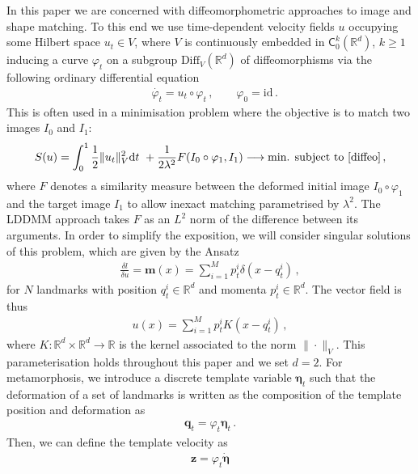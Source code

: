 \documentclass[runningheads]{llncs}
\newcommand{\half}{\frac 12}
\newcommand{\norm}[2]{\| #1 \|_{ #2 }}
\newcommand{\vnorm}[1]{\norm{ #1 }{V}}
\newcommand{\diff}[1]{\text{d} #1}
\newcommand{\Rd}{\mathbb{R}^{d}}
\begin{document}
In this paper we are concerned with diffeomorphometric approaches to image and
shape matching. To this end we use time-dependent velocity fields $u$ occupying
some Hilbert space $u_t \in V$, where $V$ is continuously embedded in
$\textsf{C}_0^k(\Rd)$, $k\geq 1$ inducing a curve $\varphi_t$ on a subgroup
$\text{Diff}_V(\Rd)$ of diffeomorphisms
\cite{arnold1966geometrie,younes2010shapes} via the following ordinary
differential equation
\begin{align}
& \dot{\varphi_t} = u_t \circ \varphi_t\, , \qquad  \varphi_0 = \text{id}\, . 
  \label{diffeo}
\end{align}
This is often used in a minimisation problem where the objective is to match two
images $I_0$ and $I_1$:
\begin{align}
  S(u) = \int_0^1 \half\vnorm{u_t}^2 \diff{t} + \frac{1}{2\lambda^2}
  F(I_0\circ\varphi_1, I_1)\longrightarrow \text{min. subject to \eqref{diffeo}}\, , \label{E-def}
\end{align}
where $F$ denotes a similarity measure between the deformed initial image
$I_0\circ \varphi_1$ and the target image $I_1$ to allow inexact matching
parametrised by $\lambda^2$. The LDDMM approach takes $F$ as an $L^2$ norm of
the difference between its arguments. In order to simplify the exposition, we
will consider singular solutions of this problem, which are given by the Ansatz
\begin{align}
  \frac{\delta l}{\delta u} = \mathbf m(x) = \sum_{i=1}^M p_t^i \delta(x-q_t^i)\,, 
\end{align}
for $N$ landmarks with position $q_t^i\in \Rd$ and momenta $p_t^i \in \Rd$.
The vector field is thus 
\begin{align}
  u(x) = \sum_{i=1}^M p_t^i K(x-q_t^i)\,, 
  \label{u-def}
\end{align}
where $K:\mathbb R^d\times \mathbb R^d\to \mathbb R$ is the kernel associated to
the norm $\|\cdot \|_V$. This parameterisation holds throughout this paper and
we set $d=2$. For metamorphosis, we introduce a discrete template variable
$\boldsymbol \eta_t$ such that the deformation of a set of landmarks is written
as the composition of the template position and deformation as
\begin{align}
  \mathbf q_t = \varphi_t \boldsymbol \eta_t\, . 
  \label{q_t}
\end{align}
Then, we can define the template velocity as 
\begin{align}
  \mathbf z = \varphi_t \dot {\boldsymbol \eta}
  \label{z_eta}
\end{align}
\end{document}
